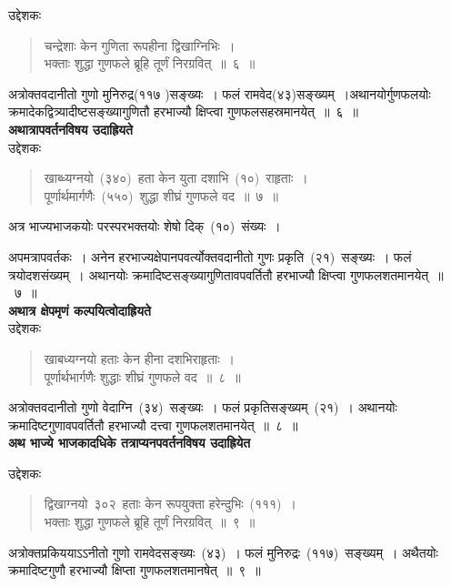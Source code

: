 \documentclass[11pt, openany]{book}
\begin{document}
उद्देशकः \textendash 
\begin{quote}
{\ku चन्द्रेशाः केन गुणिता रूपहीना द्विखाग्निभिः~।\\
भक्ताः शुद्धा गुणफले ब्रूहि तूर्णं निरग्रवित्~॥~६~॥}
\end{quote}
अत्रोक्तवदानीतो गुणो मुनिरुद्र(११७ )सङ्ख्यः~। फलं रामवेद(४३)सङ्ख्यम्~।अथानयोर्गुणफलयोः क्रमादेकद्वित्र्यादीष्टसङ्ख्यागुणितौ हरभाज्यौ क्षिप्त्वा गुणफलसहस्रमानयेत्~॥~६~॥\\
\indent
\textbf{अथात्रापवर्तनविषय उदाह्रियते\textendash}\\

उद्देशकः\textendash 
\begin{quote}
{\ku खाब्ध्यग्नयो~(३४०)~हता केन युता दशाभि~(१०)~राहृताः~।\\
पूर्णार्थमार्गणैः~(५५०)~शुद्धा शीघ्रं गुणफले वद~॥~७~॥}\\
\end{quote}
अत्र भाज्यभाजकयोः परस्परभक्तयोः शेषो दिक्~(१०)~संख्यः~।

\newpage
\thispagestyle{fancy}
\fancyhf{}

\noindent
अपमत्रापवर्तकः~। अनेन हरभाज्यक्षेपानपवर्त्योक्तवदानीतो गुणः प्रकृति~(२१)~सङ्ख्यः~। फलं त्रयोदशसंख्यम्~। अथानयोः क्रमादिष्टसङ्ख्यागुणितावपवर्तितौ हरभाज्यौ क्षिप्त्वा गुणफलशतमानयेत्~॥~७~॥\\

\indent
\textbf{अथात्र क्षेपमृणं कल्पयित्वोदाह्रियते\textendash}\\

उद्देशकः\textendash
\begin{quote}
{\ku खाबध्यग्नयो हताः केन हीना दशभिराहृताः~।\\
पूर्णार्थभार्गणैः शुद्धाः शीघ्रं गुणफले वद~॥~८~॥}
\end{quote}
\indent
अत्रोक्तवदानीतो गुणो वेदाग्नि~(३४)~सङ्ख्यः~। फलं प्रकृतिसङ्ख्यम्~(२१)~। अथानयोः क्रमादिष्टगुणावपवर्तितौ हरभाज्यौ दत्त्वा गुणफलशतमानयेत्~॥~८~॥\\

\indent
\textbf{अथ भाज्ये भाजकादधिके तत्राप्यनपवर्तनविषय उदाह्रियेत \textendash\\ }

उद्देशकः\textendash 
\begin{quote}
{\ku द्विखाग्नयो~३०२~हताः केन रूपयुक्ता हरेन्दुभिः~(१११)~।\\
भक्ताः शुद्धा गुणफले ब्रूहि तूर्णं निरग्रवित्~॥~९~॥}
\end{quote}
\indent
अत्रोक्तप्रकिययाऽऽनीतो गुणो रामवेदसङ्ख्यः~(४३)~। फलं मुनिरुद्रः~(११७)~सङ्ख्यम्~। अथैतयोः क्रमादिष्टगुणौ हरभाज्यौ क्षिप्ता गुणफलशतमानषेत्~॥~९~॥\\
\end{document}
